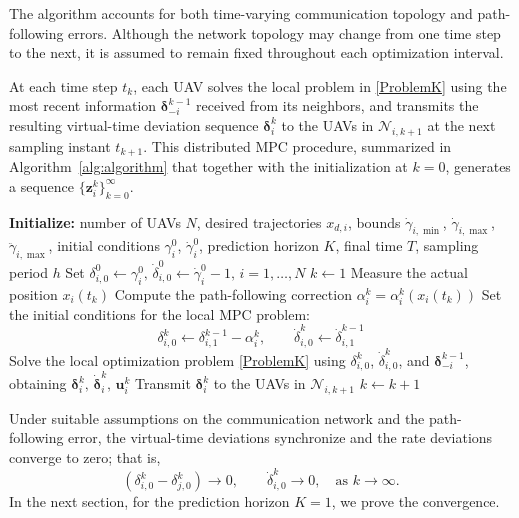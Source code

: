 \documentclass[letterpaper,journal]{IEEEtran}
\begin{document}
The algorithm accounts for both time-varying communication topology and path-following errors. Although the network topology may change from one time step to the next, it is assumed to remain fixed throughout each optimization interval.


At each time step $t_k$, each UAV solves the local problem in \eqref{ProblemK}
using the most recent information $\bm{\delta}_{-i}^{k-1}$ received from its neighbors,
and transmits the resulting virtual-time deviation sequence $\bm{\delta}_i^{k}$
to the UAVs in $\mathcal N_{i,k+1}$ at the next sampling instant $t_{k+1}$.
This distributed MPC procedure, summarized in Algorithm~\ref{alg:algorithm} that
together with the initialization at $k=0$, generates a sequence
$\{\mathbf z_i^k\}_{k=0}^{\infty}$.

\begin{algorithm}[t]
\caption{Distributed MPC for multi-agent time coordination}
\label{alg:algorithm}
\begin{algorithmic}[1]
\State \textbf{Initialize:} number of UAVs $N$, desired trajectories $x_{d,i}$, bounds $\dot{\gamma}_{i,\min}$, $\dot{\gamma}_{i,\max}$, $\ddot{\gamma}_{i,\max}$, initial conditions $\gamma_i^0$, $\dot{\gamma}_i^0$, prediction horizon $K$, final time $T$, sampling period $h$
\State Set $\delta_{i,0}^0 \gets \gamma_i^0,\,
\dot{\delta}_{i,0}^0 \gets \dot{\gamma}_i^0-1,\, i=1,\dots,N$
\State $k \gets 1$
        \State Measure the actual position $x_i(t_k)$
        \State Compute the path-following correction $\alpha_i^{k}=\alpha_i^{k}(x_i(t_{k}))$
        \State Set the initial conditions for the local MPC problem:
        \[
        \delta^{k}_{i,0} \gets \delta^{k-1}_{i,1} - \alpha_{i}^{k},
        \qquad
        \dot{\delta}^{k}_{i,0} \gets \dot{\delta}^{k-1}_{i,1}
        \]
        \State Solve the local optimization problem \eqref{ProblemK} using
        $\delta^{k}_{i,0}$, $\dot{\delta}^{k}_{i,0}$, and $\bm{\delta}_{-i}^{k-1}$,
        obtaining $\bm{\delta}_i^k,\,
        \dot{\bm{\delta}}_i^k,\,
        \bm{u}_i^k$
        \State Transmit $\bm{\delta}_i^k$ to the UAVs in $\mathcal N_{i,k+1}$
    \EndFor
    \State $k \gets k+1$
\EndWhile
\end{algorithmic}
\end{algorithm}
Under suitable assumptions on the communication network and the path-following error, the virtual-time deviations synchronize and the rate deviations converge to zero; that is,
\[
(\delta_{i,0}^k - \delta_{j,0}^k) \to 0,
\qquad
\dot{\delta}_{i,0}^k \to 0,
\quad \text{as } k \to \infty.
\]
In the next section, for the prediction horizon $K=1$, we prove the convergence.
\end{document}
